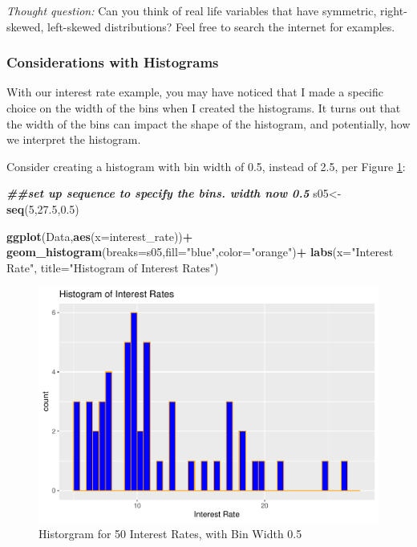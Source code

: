\documentclass[
]{book}
\newenvironment{Shaded}{\begin{snugshade}}{\end{snugshade}}
\newcommand{\AttributeTok}[1]{\textcolor[rgb]{0.13,0.29,0.53}{#1}}
\newcommand{\DecValTok}[1]{\textcolor[rgb]{0.00,0.00,0.81}{#1}}
\newcommand{\DocumentationTok}[1]{\textcolor[rgb]{0.56,0.35,0.01}{\textbf{\textit{#1}}}}
\newcommand{\FloatTok}[1]{\textcolor[rgb]{0.00,0.00,0.81}{#1}}
\newcommand{\FunctionTok}[1]{\textcolor[rgb]{0.13,0.29,0.53}{\textbf{#1}}}
\newcommand{\NormalTok}[1]{#1}
\newcommand{\OtherTok}[1]{\textcolor[rgb]{0.56,0.35,0.01}{#1}}
\newcommand{\SpecialCharTok}[1]{\textcolor[rgb]{0.81,0.36,0.00}{\textbf{#1}}}
\newcommand{\StringTok}[1]{\textcolor[rgb]{0.31,0.60,0.02}{#1}}
\begin{document}
\emph{Thought question:} Can you think of real life variables that have symmetric, right-skewed, left-skewed distributions? Feel free to search the internet for examples.

\subsubsection{Considerations with Histograms}\label{considerations-with-histograms}

With our interest rate example, you may have noticed that I made a specific choice on the width of the bins when I created the histograms. It turns out that the width of the bins can impact the shape of the histogram, and potentially, how we interpret the histogram.

Consider creating a histogram with bin width of 0.5, instead of 2.5, per Figure \ref{fig:hist05}:

\begin{Shaded}
\begin{Highlighting}[]
\DocumentationTok{\#\#set up sequence to specify the bins. width now 0.5}
\NormalTok{s05}\OtherTok{\textless{}{-}}\FunctionTok{seq}\NormalTok{(}\DecValTok{5}\NormalTok{,}\FloatTok{27.5}\NormalTok{,}\FloatTok{0.5}\NormalTok{)}

\FunctionTok{ggplot}\NormalTok{(Data,}\FunctionTok{aes}\NormalTok{(}\AttributeTok{x=}\NormalTok{interest\_rate))}\SpecialCharTok{+}
  \FunctionTok{geom\_histogram}\NormalTok{(}\AttributeTok{breaks=}\NormalTok{s05,}\AttributeTok{fill=}\StringTok{"blue"}\NormalTok{,}\AttributeTok{color=}\StringTok{"orange"}\NormalTok{)}\SpecialCharTok{+}
  \FunctionTok{labs}\NormalTok{(}\AttributeTok{x=}\StringTok{"Interest Rate"}\NormalTok{, }\AttributeTok{title=}\StringTok{"Histogram of Interest Rates"}\NormalTok{)}
\end{Highlighting}
\end{Shaded}

\begin{figure}
\centering
\includegraphics{bookdown-demo_files/figure-latex/hist05-1.pdf}
\caption{\label{fig:hist05}Historgram for 50 Interest Rates, with Bin Width 0.5}
\end{figure}
\end{document}
